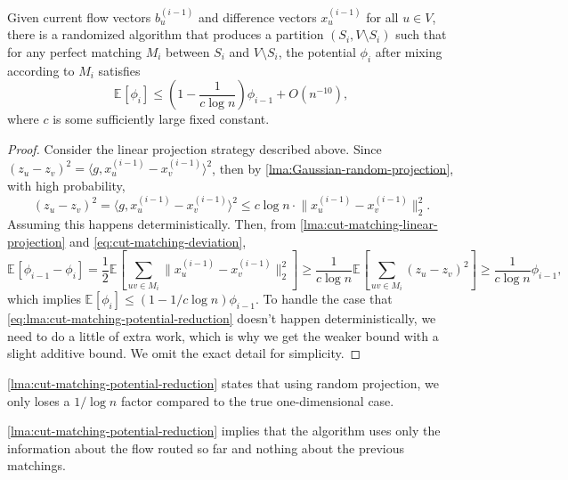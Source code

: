 \begin{lemma}\label{lma:cut-matching-potential-reduction}
	Given current flow vectors \(b_u^{(i-1)}\) and difference vectors \(x_u^{(i-1)}\) for all \(u \in V\), there is a randomized algorithm that produces a partition \((S_i, V\setminus S_i)\) such that for any perfect matching \(M_i\) between \(S_i\) and \(V\setminus S_i\), the potential \(\phi _{i}\) after mixing according to \(M_i\) satisfies
	\[
		\mathbb{E}_{}[\phi _i]
		\leq \left( 1 - \frac{1}{c \log n} \right) \phi _{i-1} + O(n^{-10}),
	\]
	where \(c\) is some sufficiently large fixed constant.
\end{lemma}
\begin{proof}
	Consider the linear projection strategy described above. Since \((z_u - z_v)^2 = \langle g, x_u^{(i-1)} - x_v^{(i-1)} \rangle ^2\), then by \autoref{lma:Gaussian-random-projection}, with high probability,
	\begin{equation}\label{eq:lma:cut-matching-potential-reduction}
		(z_u - z_v)^2
		= \langle g, x_u^{(i-1)} - x_v^{(i-1)} \rangle ^2
		\leq c \log n \cdot \lVert x_u^{(i-1)} - x_v^{(i-1)} \rVert _2^2.
	\end{equation}
	Assuming this happens deterministically. Then, from \autoref{lma:cut-matching-linear-projection} and \autoref{eq:cut-matching-deviation},
	\[
		\mathbb{E}_{}[\phi _{i-1} - \phi _i]
		= \frac{1}{2} \mathbb{E}_{}\left[\sum_{uv \in M_i} \lVert x_u^{(i-1)} - x_v^{(i-1)} \rVert _2^2 \right]
		\geq \frac{1}{c \log n} \mathbb{E}_{}\left[\sum_{uv \in M_i} (z_u - z_v)^2 \right]
		\geq \frac{1}{c \log n} \phi _{i-1},
	\]
	which implies \(\mathbb{E}_{}[\phi _i] \leq (1 - 1 / c \log n) \phi _{i-1}\). To handle the case that \autoref{eq:lma:cut-matching-potential-reduction} doesn't happen deterministically, we need to do a little of extra work, which is why we get the weaker bound with a slight additive bound. We omit the exact detail for simplicity.
\end{proof}

\begin{intuition}
	\autoref{lma:cut-matching-potential-reduction} states that using random projection, we only loses a \(1 / \log n\) factor compared to the true one-dimensional case.
\end{intuition}

\begin{remark}
	\autoref{lma:cut-matching-potential-reduction} implies that the algorithm uses only the information about the flow routed so far and nothing about the previous matchings.
\end{remark}

